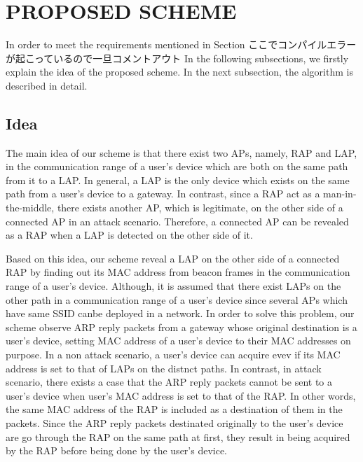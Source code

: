 \documentclass[conference]{IEEEtran}
\begin{document}
\section{PROPOSED SCHEME}
In order to meet the requirements mentioned in Section ここでコンパイルエラーが起こっているので一旦コメントアウト %
In the following subsections, we firstly explain the idea of the proposed scheme.
In the next subsection, the algorithm is described in detail.

\subsection{Idea}
The main idea of our scheme is that there exist two APs, namely, RAP and LAP, in the communication range of a user's device which are both on the same path from it to a LAP.
In general, a LAP is the only device which exists on the same path from a user's device to a gateway.
In contrast, since a RAP act as a man-in-the-middle, there exists another AP, which is legitimate, on the other side of a connected AP in an attack scenario.
Therefore, a connected AP can be revealed as a RAP when a LAP is detected on the other side of it.

Based on this idea, our scheme reveal a LAP on the other side of a connected RAP by finding out its MAC address from beacon frames in the communication range of a user's device.
Although, it is assumed that there exist LAPs on the other path in a communication range of a user's device since several APs which have same SSID canbe deployed in a network.
In order to solve this problem, our scheme observe ARP reply packets from a gateway whose original destination is a user's device, setting MAC address of a user's device to their MAC addresses on purpose.
In a non attack scenario, a user's device can acquire evev if its MAC address is set to that of LAPs on the distnct paths.
In contrast, in attack scenario, there exists a case that the ARP reply packets cannot be sent to a user's device when user's MAC address is set to that of the RAP.
In other words, the same MAC address of the RAP is included as a destination of them in the packets.
Since the ARP reply packets destinated originally to the user's device are go through the RAP on the same path at first, they result in being acquired by the RAP before being done by the user's device.
\end{document}
